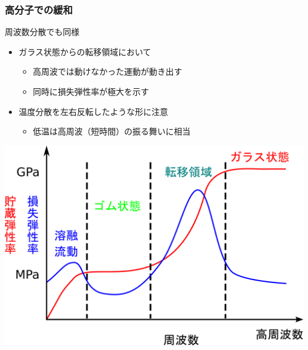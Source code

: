 \documentclass[12pt, dvipdfmx]{beamer}
\begin{document}
\begin{frame}
    \frametitle{高分子での緩和}
			\begin{block}{周波数分散でも同様}
				\begin{itemize}
					\item ガラス状態からの転移領域において
					\begin{itemize}
						\item 高周波では動けなかった運動が動き出す
						\item 同時に損失弾性率が極大を示す
					\end{itemize}
					\item \alert{温度分散を左右反転したような形に注意}
					\begin{itemize}
                        \item 低温は高周波（短時間）の振る舞いに相当
                    \end{itemize}
				\end{itemize}

				\vspace{2mm}
				\centering
				\includegraphics[width=.45\textwidth]{dynamic_ViscoElast_Freq.png}
			\end{block}
			
\end{frame}
\end{document}
